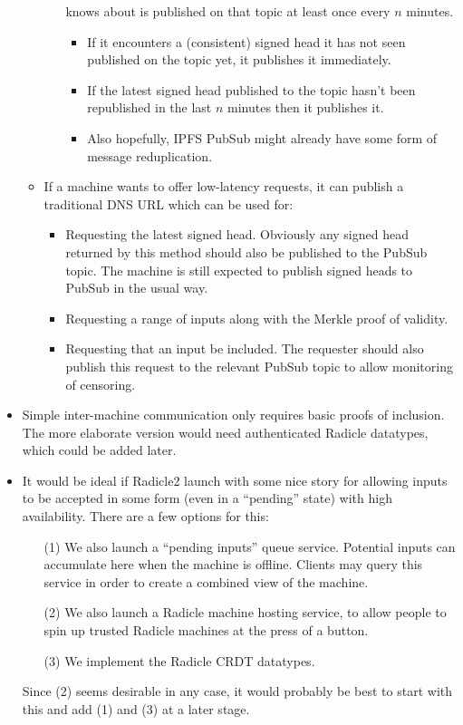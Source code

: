 \documentclass[a4paper, oneside, 10pt]{amsart}
\begin{document}
\begin{itemize}
\begin{itemize}
\begin{itemize}
      knows about is published on that topic at least once every $n$ minutes.
      \begin{itemize}
      \item
        If it encounters a (consistent) signed head it has not seen published on
        the topic yet, it publishes it immediately.
      \item
        If the latest signed head published to the topic hasn't been republished
        in the last $n$ minutes then it publishes it.
      \item
        Also hopefully, IPFS PubSub might already have some form of message
        reduplication.
      \end{itemize}
    \end{itemize}
  \item
    If a machine wants to offer low-latency requests, it can publish a
    traditional DNS URL which can be used for:
    \begin{itemize}
    \item
      Requesting the latest signed head. Obviously any signed head returned by
      this method should also be published to the PubSub topic. The machine is
      still expected to publish signed heads to PubSub in the usual way.
    \item
      Requesting a range of inputs along with the Merkle proof of validity.
    \item
      Requesting that an input be included. The requester should also publish
      this request to the relevant PubSub topic to allow monitoring of
      censoring.
    \end{itemize}
  \end{itemize}
\item
  Simple inter-machine communication only requires basic proofs of
  inclusion. The more elaborate version would need authenticated Radicle
  datatypes, which could be added later.
\item
  It would be ideal if Radicle2 launch with some nice story for allowing inputs
  to be accepted in some form (even in a ``pending'' state) with high
  availability. There are a few options for this:
  \begin{itemize}
  \item[(1)]
    We also launch a ``pending inputs'' queue service. Potential inputs can
    accumulate here when the machine is offline. Clients may query this service
    in order to create a combined view of the machine.
  \item[(2)]
    We also launch a Radicle machine hosting service, to allow people to spin up
    trusted Radicle machines at the press of a button.
  \item[(3)]
    We implement the Radicle CRDT datatypes.
  \end{itemize}
  Since (2) seems desirable in any case, it would probably be best to start with
  this and add (1) and (3) at a later stage.


\end{itemize}
\end{document}

